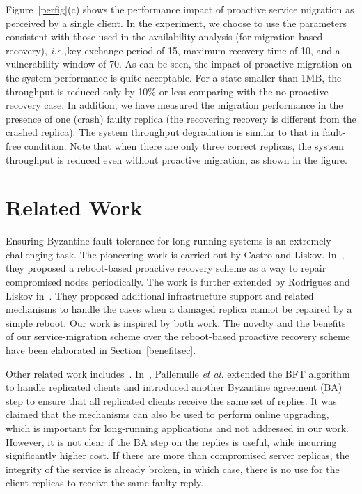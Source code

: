 \documentclass[times, 10pt, twocolumn]{article}
\newcommand{\ie}{{\it i.e.,}}
\begin{document}
Figure~\ref{perfig}(c) shows the performance impact of proactive service
migration as perceived by a single client. In the experiment, we choose
to use the parameters consistent with those used in the availability
analysis (for migration-based recovery), \ie key exchange period of 15,
maximum recovery time of 10, and a vulnerability window of 70.
As can be seen, the impact of proactive migration on the system performance
is quite acceptable. For a state smaller than 1MB, the throughput is reduced
only by 10\% or less comparing with the no-proactive-recovery case. 
In addition, we have measured the migration performance in the presence of
one (crash) faulty replica (the recovering recovery is different from
the crashed replica). The system throughput degradation is similar to that
in fault-free condition. Note that when there are only three correct replicas,
the system throughput is reduced even without proactive migration, as shown
in the figure.

\section{Related Work}

Ensuring Byzantine fault tolerance for long-running systems
is an extremely challenging task. The pioneering work is carried
out by Castro and Liskov. In~\cite{bft-acm}, they proposed a
reboot-based proactive recovery scheme as a way to repair compromised
nodes periodically. The work is further extended by Rodrigues 
and Liskov in~\cite{bftlls}. They proposed additional infrastructure
support and related mechanisms to handle the cases when a damaged replica
cannot be repaired by a simple reboot. Our work is inspired by both work.
The novelty and the benefits of our service-migration scheme 
over the reboot-based proactive recovery scheme have been elaborated in 
Section~\ref{benefitsec}. 

Other related work includes~\cite{pallemulle}. In~\cite{pallemulle}, 
Pallemulle {\em et al.} extended the BFT algorithm to handle replicated 
clients and 
introduced another Byzantine agreement (BA) step to ensure that all replicated 
clients receive the same set of replies. It was claimed that the mechanisms 
can also be used to perform online upgrading, which is important for 
long-running applications and not addressed in our work. However, it is not
clear if the BA step on the replies is useful, while incurring significantly 
higher cost. If there are more than  compromised server replicas, the
integrity of the service is already broken, in which case, there is no use
for the client replicas to receive the same faulty reply.
\end{document}
